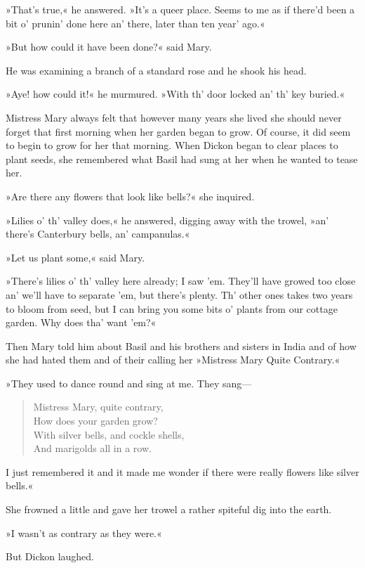 »That's true,« he answered. »It's a queer place. Seems to me as if there'd been a bit o' prunin' done here an' there, later than ten year' ago.«

»But how could it have been done?« said Mary.

He was examining a branch of a standard rose and he shook his head.

»Aye! how could it!« he murmured. »With th' door locked an' th' key buried.«

Mistress Mary always felt that however many years she lived she should never forget that first morning when her garden began to grow. Of course, it did seem to begin to grow for her that morning. When Dickon began to clear places to plant seeds, she remembered what Basil had sung at her when he wanted to tease her.

»Are there any flowers that look like bells?« she inquired.

»Lilies o' th' valley does,« he answered, digging away with the trowel, »an' there's Canterbury bells, an' campanulas.«

»Let us plant some,« said Mary.

»There's lilies o' th' valley here already; I saw 'em. They'll have growed too close an' we'll have to separate 'em, but there's plenty. Th' other ones takes two years to bloom from seed, but I can bring you some bits o' plants from our cottage garden. Why does tha' want 'em?«

Then Mary told him about Basil and his brothers and sisters in India and of how she had hated them and of their calling her »Mistress Mary Quite Contrary.«

»They used to dance round and sing at me. They sang—

\begin{verse}
Mistress Mary, quite contrary,\\
How does your garden grow?\\
With silver bells, and cockle shells,\\
And marigolds all in a row.
\end{verse}

\noindent I just remembered it and it made me wonder if there were really flowers like silver bells.«

She frowned a little and gave her trowel a rather spiteful dig into the earth.

»I wasn't as contrary as they were.«

But Dickon laughed.


